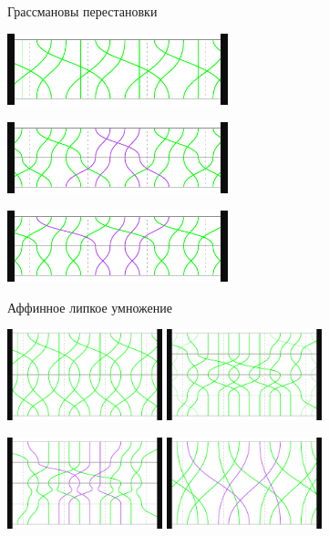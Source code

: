 \documentclass[svgnames]{beamer}
\begin{document}
\begin{frame}{Грассмановы перестановки}

\begin{center}
  \includegraphics[width=6.4cm]{img-fg/tP}
  
  \includegraphics[width=6.4cm]{img-fg/tP-FG}

  \includegraphics[width=6.4cm]{img-fg/tP-GF}
\end{center}

\end{frame}


\begin{frame}{Аффинное липкое умножение}

\begin{center}
  \includegraphics[width=4.5cm]{img-fg/PQ-base} \hspace{4mm}
  \includegraphics[width=4.5cm]{img-fg/PQ-GF3n} \vspace{2mm}

  \includegraphics[width=4.5cm]{img-fg/PQ-GF3n-untg} \hspace{4mm}
  \includegraphics[width=4.5cm]{img-fg/PQ-GF3n-z}  
\end{center}

\end{frame}
\end{document}
